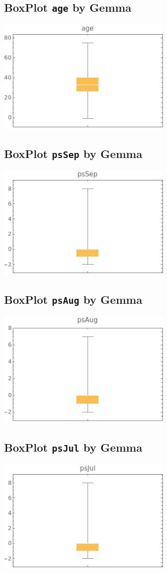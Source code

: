 \documentclass[a4paper]{article}
\begin{document}
\subsection{BoxPlot {\tt age} by Gemma}
\includegraphics[width=0.62\textwidth]{imgs/age.jpeg}

\subsection{BoxPlot {\tt psSep} by Gemma}
\includegraphics[width=0.62\textwidth]{imgs/psSep.jpeg}

\subsection{BoxPlot {\tt psAug} by Gemma}
\includegraphics[width=0.62\textwidth]{imgs/psAug.jpeg}

\subsection{BoxPlot {\tt psJul} by Gemma}
\includegraphics[width=0.62\textwidth]{imgs/psJul.jpeg}
\end{document}

